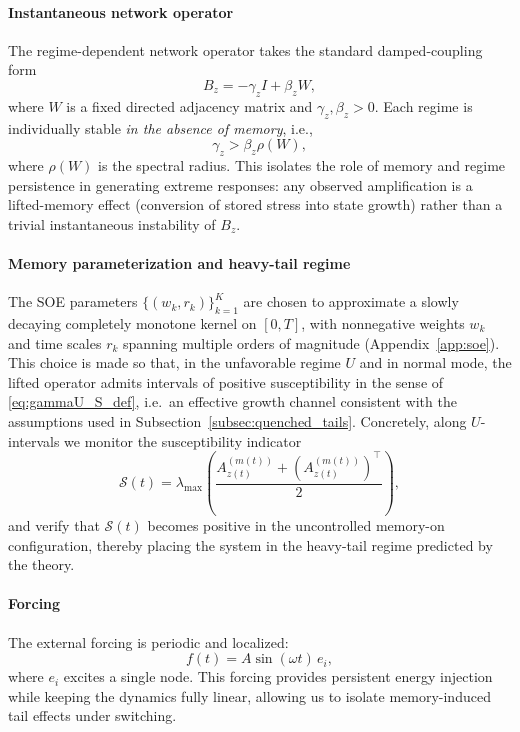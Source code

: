 \documentclass[12pt,a4paper]{article}
\theoremstyle{definition}
\theoremstyle{remark}
\begin{document}
\paragraph{Instantaneous network operator}
The regime-dependent network operator takes the standard damped-coupling form
\begin{equation}
	\label{eq:Bz_def}
	B_z = -\gamma_z I + \beta_z W,
\end{equation}
where $W$ is a fixed directed adjacency matrix and $\gamma_z,\beta_z>0$.
Each regime is individually stable \emph{in the absence of memory}, i.e.,
\[
\gamma_z > \beta_z \rho(W),
\]
where $\rho(W)$ is the spectral radius. This isolates the role of memory and
regime persistence in generating extreme responses: any observed amplification
is a lifted-memory effect (conversion of stored stress into state growth) rather
than a trivial instantaneous instability of $B_z$.

\paragraph{Memory parameterization and heavy-tail regime}
The SOE parameters $\{(w_k,r_k)\}_{k=1}^K$ are chosen to approximate a slowly
decaying completely monotone kernel on $[0,T]$, with nonnegative weights $w_k$
and time scales $r_k$ spanning multiple orders of magnitude (Appendix~\ref{app:soe}).
This choice is made so that, in the unfavorable regime $U$ and in normal mode,
the lifted operator admits intervals of positive susceptibility in the sense of
\eqref{eq:gammaU_S_def}, i.e.\ an effective growth channel consistent with the
assumptions used in Subsection~\ref{subsec:quenched_tails}. Concretely, along
$U$-intervals we monitor the susceptibility indicator
\[
\mathcal{S}(t)=
\lambda_{\max}\!\left(
\frac{A_{z(t)}^{(m(t))}+(A_{z(t)}^{(m(t))})^\top}{2}
\right),
\]
and verify that $\mathcal{S}(t)$ becomes positive in the uncontrolled
memory-on configuration, thereby placing the system in the heavy-tail regime
predicted by the theory.

\paragraph{Forcing}
The external forcing is periodic and localized:
\begin{equation}
	f(t) = A \sin(\omega t)\,e_i,
\end{equation}
where $e_i$ excites a single node. This forcing provides persistent energy
injection while keeping the dynamics fully linear, allowing us to isolate
memory-induced tail effects under switching.
\end{document}
